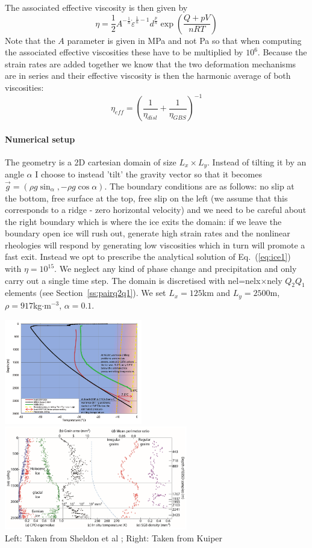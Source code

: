 The associated effective viscosity is then given by 
\[
\eta = \frac{1}{2}  A^{-\frac{1}{n}} \dot{\varepsilon}^{\frac{1}{n}-1}  d^{\frac{p}{n}} \exp \left( \frac{Q+pV}{nRT} \right)
\]
Note that the $A$ parameter is given in MPa and not Pa so that when computing the 
associated effective viscosities these have to be multiplied by $10^6$.
Because the strain rates are added together we know that the two deformation mechanisms are in series and their
effective viscosity is then the harmonic average of both viscosities:
\[
\eta_{eff} = \left(\frac{1}{\eta_{disl}} + \frac{1}{\eta_{GBS}}  \right)^{-1}
\]

\paragraph{Numerical setup}

The geometry is a 2D cartesian domain of size $L_x \times L_y$. Instead of tilting it by an angle $\alpha$
I choose to instead 'tilt' the gravity vector so that it becomes 
$\vec{g}=(\rho g \sin_\alpha,-\rho g\cos\alpha)$.
The boundary conditions are as follows: no slip at the bottom, free surface at the top, 
free slip on the left (we assume that this corresponds to a ridge - zero horizontal velocity)
and we need to be careful about the right boundary which is where the ice exits the domain:
if we leave the boundary open ice will rush out, generate high strain rates and the nonlinear 
rheologies will respond by generating low viscosities which in turn will promote a fast 
exit. Instead we opt to prescribe the analytical solution of Eq.~(\ref{eq:ice1}) with $\eta=10^{15}$.
We neglect any kind of phase change and precipitation and only carry out a single time step.
The domain is discretised with nel=nelx$\times$nely $Q_2Q_1$ elements (see Section~\ref{ss:pairq2q1}).
We set $L_x=125$km and $L_y=2500$m, $\rho=917$kg$\cdot$m$^{-3}$, $\alpha=0.1$\degree.



\begin{center}
\includegraphics[width=6cm]{python_codes/fieldstone_59/images/shsh14}
\includegraphics[width=8cm]{python_codes/fieldstone_59/images/kuiper19}\\
{\captionfont Left: Taken from Sheldon et al \cite{shsh14}; 
Right: Taken from Kuiper \cite{kuiper19}}
\end{center}

